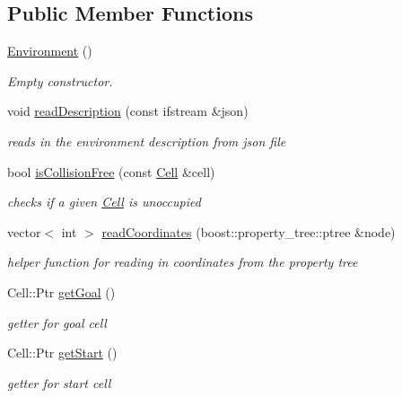\subsection*{\-Public \-Member \-Functions}
\begin{DoxyCompactItemize}
\item 
\hypertarget{class_environment_a8b427c4448d8b7536666837521b9e83d}{\hyperlink{class_environment_a8b427c4448d8b7536666837521b9e83d}{\-Environment} ()}\label{class_environment_a8b427c4448d8b7536666837521b9e83d}

\begin{DoxyCompactList}\small\item\em \-Empty constructor. \end{DoxyCompactList}\item 
void \hyperlink{class_environment_a79909fe4c211b4cf8de7108fe4b01946}{read\-Description} (const ifstream \&json)
\begin{DoxyCompactList}\small\item\em reads in the environment description from json file \end{DoxyCompactList}\item 
bool \hyperlink{class_environment_a3c7c3a42c761f7b44a65cd54df53aee6}{is\-Collision\-Free} (const \hyperlink{struct_cell}{\-Cell} \&cell)
\begin{DoxyCompactList}\small\item\em checks if a given \hyperlink{struct_cell}{\-Cell} is unoccupied \end{DoxyCompactList}\item 
vector$<$ int $>$ \hyperlink{class_environment_a51c86c03c10f50b7fc366b134d66fdae}{read\-Coordinates} (boost\-::property\-\_\-tree\-::ptree \&node)
\begin{DoxyCompactList}\small\item\em helper function for reading in coordinates from the property tree \end{DoxyCompactList}\item 
\-Cell\-::\-Ptr \hyperlink{class_environment_a1eb91b74ba211896d9de8ac89da308ef}{get\-Goal} ()
\begin{DoxyCompactList}\small\item\em getter for goal cell \end{DoxyCompactList}\item 
\-Cell\-::\-Ptr \hyperlink{class_environment_adb44973d4cd3252e64e1c225c87ecd36}{get\-Start} ()
\begin{DoxyCompactList}\small\item\em getter for start cell \end{DoxyCompactList}\end{DoxyCompactItemize}


